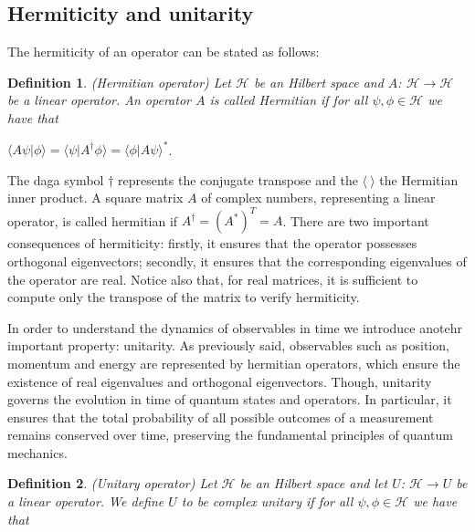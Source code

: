 \documentclass{Configuration_Files/PoliMi3i_thesis}
\newtheorem{definition}{Definition}[chapter]
\begin{document}
\subsection{Hermiticity and unitarity}

The hermiticity of an operator can be stated as follows:

\begin{definition} (Hermitian operator) Let $\mathscr{H}$ be an Hilbert space and  $A$: $\mathscr{H} \rightarrow \mathscr{H}$ be a linear operator. An operator $A$ is called Hermitian if for all $\psi,\phi \in \mathscr{H}$ we have that
\end{definition}

\begin{center}
	$\langle A\psi|\phi \rangle = \langle \psi|A^{\dagger}\phi \rangle = \langle \phi|A\psi \rangle^{*}$.
\end{center}

The daga symbol $\dagger$ represents the conjugate transpose and the $\langle \ \rangle$ the Hermitian inner product. A square matrix $A$ of complex numbers, representing a linear operator, is called hermitian if $A^{\dagger} = (A^*)^T = A$. There are two important consequences of hermiticity: firstly, it ensures that the operator possesses orthogonal eigenvectors; secondly, it ensures that the corresponding eigenvalues of the operator are real. 
Notice also that, for real matrices, it is sufficient to compute only the transpose of the matrix to verify hermiticity. \newline

In order to understand the dynamics of observables in time we introduce anotehr important property: unitarity. 
As previously said, observables such as position, momentum and energy are represented by hermitian operators, which ensure the existence of real eigenvalues and orthogonal eigenvectors. Though, unitarity governs the evolution in time of quantum states and operators. In particular, it ensures that the total probability of all possible outcomes of a measurement remains conserved over time, preserving the fundamental principles of quantum mechanics. 

\begin{definition} (Unitary operator) Let $\mathscr{H}$ be an Hilbert space and let $U$: $\mathscr{H} \rightarrow U$ be a linear operator. We define $U$ to be complex unitary if for all $\psi,\phi \in \mathscr{H}$ we have that
\end{definition}
\end{document}
